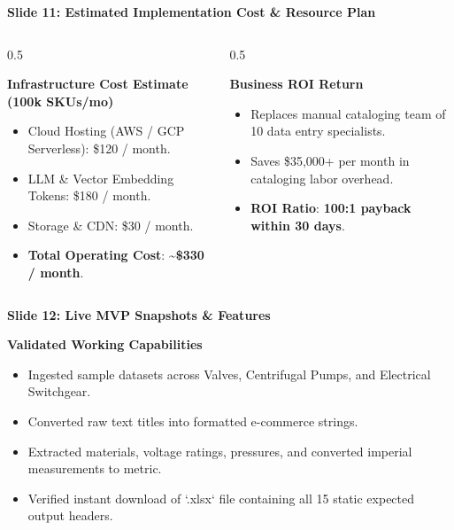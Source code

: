 \documentclass[aspectratio=169, 10pt]{beamer}
\begin{document}
\begin{frame}{\textbf{Slide 11: Estimated Implementation Cost \& Resource Plan}}
  \begin{columns}
    \begin{column}{0.5\textwidth}
      \begin{block}{\textbf{Infrastructure Cost Estimate (100k SKUs/mo)}}
        \begin{itemize}
          \item Cloud Hosting (AWS / GCP Serverless): \$120 / month.
          \item LLM \& Vector Embedding Tokens: \$180 / month.
          \item Storage \& CDN: \$30 / month.
          \item \textbf{Total Operating Cost}: \textbf{\textasciitilde\$330 / month}.
        \end{itemize}
      \end{block}
    \end{column}

    \begin{column}{0.5\textwidth}
      \begin{block}{\textbf{Business ROI Return}}
        \begin{itemize}
          \item Replaces manual cataloging team of 10 data entry specialists.
          \item Saves \$35,000+ per month in cataloging labor overhead.
          \item \textbf{ROI Ratio}: \textbf{100:1 payback within 30 days}.
        \end{itemize}
      \end{block}
    \end{column}
  \end{columns}
\end{frame}

\begin{frame}{\textbf{Slide 12: Live MVP Snapshots \& Features}}
  \begin{block}{\textbf{Validated Working Capabilities}}
    \begin{itemize}
      \item Ingested sample datasets across Valves, Centrifugal Pumps, and Electrical Switchgear.
      \item Converted raw text titles into formatted e-commerce strings.
      \item Extracted materials, voltage ratings, pressures, and converted imperial measurements to metric.
      \item Verified instant download of `.xlsx` file containing all 15 static expected output headers.
    \end{itemize}
  \end{block}
\end{frame}
\end{document}
